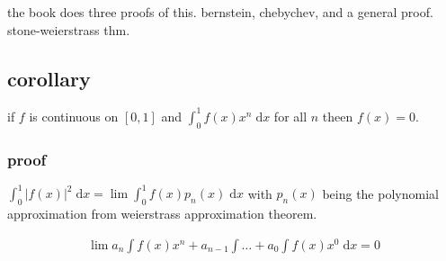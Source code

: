 \documentclass[letterpaper]{article}
\begin{document}
the book does three proofs of this. bernstein, chebychev, and a general proof. stone-weierstrass thm.

\subsection*{corollary}
if $f$ is continuous on $[0,1]$ and $\int_0^1f(x)x^n\;\mathrm{d}x$ for all $n$ theen $f(x)=0$.

\subsubsection*{proof}
$\int_0^1{|f(x)|^2\;\mathrm{d}x}=\lim\int_0^1f(x)p_n(x)\;\mathrm{d}x$ with $p_n(x)$ being the polynomial approximation from weierstrass approximation theorem.

\begin{align*}
  \lim a_n\int f(x)x^n+a_{n-1}\int\dots+a_0\int f(x)x^0\;\mathrm{d}x=0
\end{align*}
\end{document}
